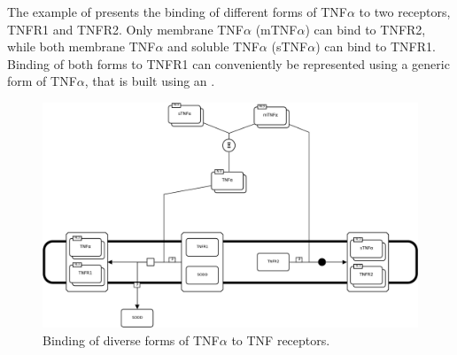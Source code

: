 The example of  presents the binding of different forms of TNF$\alpha$ to two receptors, TNFR1 and TNFR2.
Only membrane TNF$\alpha$ (mTNF$\alpha$) can bind to TNFR2, while both membrane TNF$\alpha$ and soluble TNF$\alpha$ (sTNF$\alpha$) can bind to TNFR1.
Binding of both forms to TNFR1 can conveniently be represented using a generic form of TNF$\alpha$, that is built using an .

\begin{figure}
\begin{center}
\includegraphics[scale=0.45]{images/build/d1_1_example.pdf}
\end{center}
\caption{Binding of diverse forms of TNF$\alpha$ to TNF receptors.}
\label{fig:D1_1}
\end{figure}
